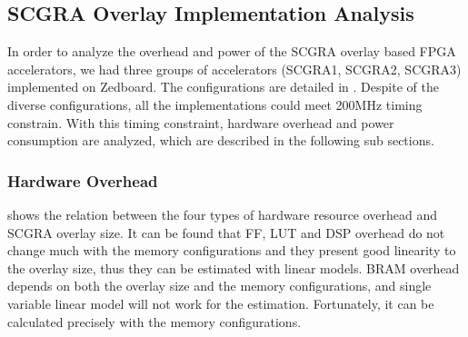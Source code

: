 \subsection{SCGRA Overlay Implementation Analysis}
In order to analyze the overhead and power of the SCGRA overlay 
based FPGA accelerators, we had three groups of accelerators 
(SCGRA1, SCGRA2, SCGRA3) implemented on Zedboard. The configurations 
are detailed in . Despite of the diverse 
configurations, all the implementations could meet 200MHz 
timing constrain. With this timing constraint, 
hardware overhead and power consumption are analyzed, which are described 
in the following sub sections.
\begin{table}[tb]
\end{table}

\subsubsection{Hardware Overhead}
 shows the relation between 
the four types of hardware resource overhead and SCGRA 
overlay size. It can be found that FF, LUT and DSP overhead 
do not change much with the memory configurations and they 
present good linearity to the overlay size, thus they can be 
estimated with linear models. BRAM overhead depends 
on both the overlay size and the memory configurations, 
and single variable linear model will not work for the estimation.
Fortunately, it can be calculated precisely with the memory 
configurations. 

